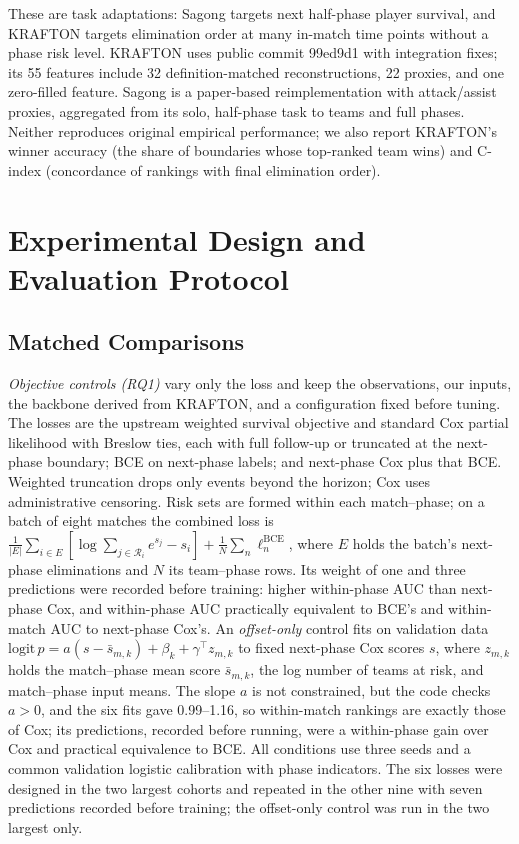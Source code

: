 \documentclass[sigconf,anonymous,nonacm]{acmart}
\begin{document}
These are task adaptations: Sagong targets next half-phase player survival, and KRAFTON targets elimination order at many in-match time points without a phase risk level. KRAFTON uses public commit 99ed9d1 with integration fixes; its 55 features include 32 definition-matched reconstructions, 22 proxies, and one zero-filled feature. Sagong is a paper-based reimplementation with attack/assist proxies, aggregated from its solo, half-phase task to teams and full phases. Neither reproduces original empirical performance; we also report KRAFTON's winner accuracy (the share of boundaries whose top-ranked team wins) and C-index (concordance of rankings with final elimination order).

\section{Experimental Design and Evaluation Protocol}
\label{sec:method:evaluation}
\subsection{Matched Comparisons}
\label{sec:method:decomposition}
\emph{Objective controls (RQ1)} vary only the loss and keep the observations, our inputs, the backbone derived from KRAFTON, and a configuration fixed before tuning. The losses are the upstream weighted survival objective and standard Cox partial likelihood with Breslow ties, each with full follow-up or truncated at the next-phase boundary; BCE on next-phase labels; and next-phase Cox plus that BCE. Weighted truncation drops only events beyond the horizon; Cox uses administrative censoring. Risk sets are formed within each match--phase; on a batch of eight matches the combined loss is $\frac{1}{|E|}\sum_{i\in E}[\log\sum_{j\in\mathcal{R}_i}e^{s_j}-s_i]+\frac{1}{N}\sum_{n}\ell^{\mathrm{BCE}}_n$, where $E$ holds the batch's next-phase eliminations and $N$ its team--phase rows. Its weight of one and three predictions were recorded before training: higher within-phase AUC than next-phase Cox, and within-phase AUC practically equivalent to BCE's and within-match AUC to next-phase Cox's. An \emph{offset-only} control fits on validation data $\mathrm{logit}\,p=a(s-\bar s_{m,k})+\beta_k+\gamma^{\top}z_{m,k}$ to fixed next-phase Cox scores $s$, where $z_{m,k}$ holds the match--phase mean score $\bar s_{m,k}$, the log number of teams at risk, and match--phase input means. The slope $a$ is not constrained, but the code checks $a>0$, and the six fits gave 0.99--1.16, so within-match rankings are exactly those of Cox; its predictions, recorded before running, were a within-phase gain over Cox and practical equivalence to BCE. All conditions use three seeds and a common validation logistic calibration with phase indicators. The six losses were designed in the two largest cohorts and repeated in the other nine with seven predictions recorded before training; the offset-only control was run in the two largest only.
\end{document}
